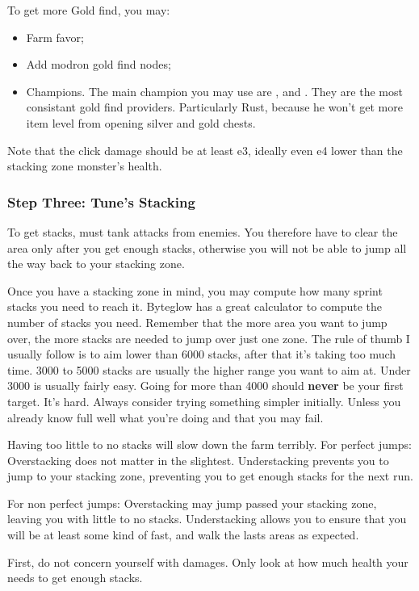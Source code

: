 \documentclass{article}
\begin{document}
To get more Gold find, you may:
\begin{itemize}
    \item Farm favor;
    \item Add modron gold find nodes;
    \item Champions.
    The main champion you may use are \rust, \jarlaxle and \azaka.
    They are the most consistant gold find providers.
    Particularly Rust, because he won't get more item level from opening silver and gold chests.
\end{itemize}

Note that the click damage should be at least e3, ideally even e4 lower than the stacking zone monster's health.

\subsubsection{Step Three: Tune\briv's Stacking}
\label{sec:stepThree}

To get stacks, \briv must tank attacks from enemies.
You therefore have to clear the area only after you get enough stacks, otherwise you will not be able to jump all the way back to your stacking zone.


Once you have a stacking zone in mind, you may compute how many sprint stacks you need to reach it.
Byteglow has a great calculator to compute the number of stacks you need.
Remember that the more area you want to jump over, the more stacks are needed to jump over just one zone.
The rule of thumb I usually follow is to aim lower than 6000 stacks, after that it's taking too much time.
3000 to 5000 stacks are usually the higher range you want to aim at.
Under 3000 is usually fairly easy.
Going for more than 4000 should \textbf{never} be your first target.
It's hard.
Always consider trying something simpler initially.
Unless you already know full well what you're doing and that you may fail.

Having too little to no stacks will slow down the farm terribly.
For perfect jumps:
    Overstacking does not matter in the slightest.
    Understacking prevents you to jump to your stacking zone, preventing you to get enough stacks for the next run.

For non perfect jumps:
    Overstacking may jump passed your stacking zone, leaving you with little to no stacks.
    Understacking allows you to ensure that you will be at least some kind of fast, and walk the lasts areas as expected.

First, do not concern yourself with damages.
Only look at how much health your \briv needs to get enough stacks.
\end{document}
